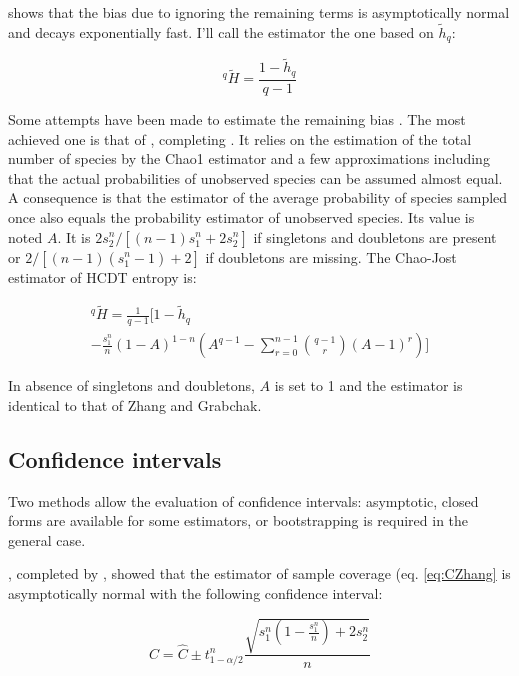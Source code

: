 \documentclass[fleqn,10pt]{latex/stylish_article} %
\begin{document}
\citet{Zhang2013a} shows that the bias due to ignoring the remaining terms is asymptotically normal and decays exponentially fast.
I'll call the \citet{Zhang2014} estimator the one based on \(\tilde{h}_{q}\):

\begin{equation}
  ^{q}{\tilde{H}} = \frac{1-\tilde{h}_{q}}{q-1}
  \label{eq:Zhang2014}
\end{equation}

Some attempts have been made to estimate the remaining bias \citep{Zhang2013}.
The most achieved one is that of \citet{Chao2015}, completing \citet{Chao2013}.
It relies on the estimation of the total number of species by the Chao1 estimator and a few approximations including that the actual probabilities of unobserved species can be assumed almost equal.
A consequence is that the estimator of the average probability of species sampled once also equals the probability estimator of unobserved species.
Its value is noted \(A\).
It is \(2 {s}^{n}_{2} / {\left[\left( n-1 \right) {s}^{n}_{1} +2 {s}^{n}_{2} \right]}\) if singletons and doubletons are present or \(2/{\left[\left(n-1\right)\left({s}^{n}_{1} -1\right)+2\right]}\) if doubletons are missing.
The Chao-Jost estimator of HCDT entropy is:

\begin{multline}
  ^{q}{\tilde{H}}
    = \frac{1}{q-1} [ 1 -\tilde{h}_q \\
    -\frac{{s}^{n}_{1}}{n} {\left( 1-A \right)}^{1-n} \left( A^{q-1} -\sum^{n-1}_{r=0}{\binom{q-1}{r} {\left(A-1\right)}^r} \right) ]
\end{multline}

In absence of singletons and doubletons, \(A\) is set to 1 and the estimator is identical to that of Zhang and Grabchak.

\hypertarget{confidence-intervals}{%
\subsection{Confidence intervals}\label{confidence-intervals}}

Two methods allow the evaluation of confidence intervals: asymptotic, closed forms are available for some estimators, or bootstrapping is required in the general case.

\citet{Esty1983}, completed by \citet{Zhang2007}, showed that the estimator of sample coverage (eq. \eqref{eq:CZhang} is asymptotically normal with the following confidence interval:

\begin{equation}
    C=\hat{C}\pm t^{n}_{1-\alpha/2} \frac{\sqrt{{s}^{n}_{1}\left(1-\frac{{s}^{n}_{1}}{n}\right)+2{s}^{n}_{2}}}{n} 
\end{equation}
\end{document}

